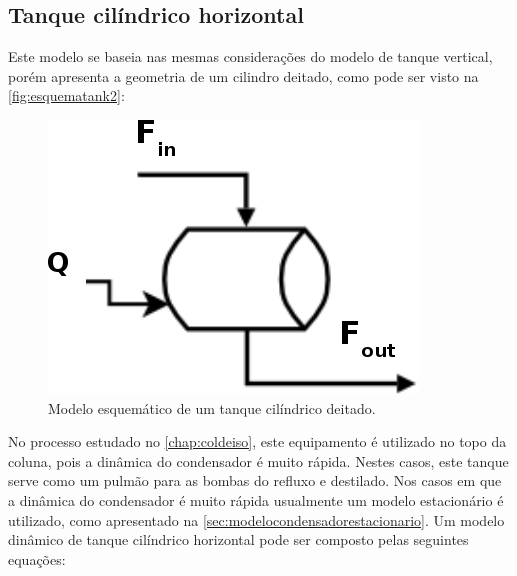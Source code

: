 \subsection{Tanque cilíndrico horizontal} \label{sec:modelotanquecilindrodeitado}
Este modelo se baseia nas mesmas considerações do modelo de tanque vertical,
porém apresenta a geometria de um cilindro deitado, como pode ser visto na \autoref{fig:esquematank2}:
\begin{figure}[htb]
\centering \includegraphics[scale=0.5]{images/Chap3/esquematank_22.png}
\caption{Modelo esquemático de um tanque cilíndrico deitado.}
\label{fig:esquematank2}
\end{figure}

No processo estudado no \autoref{chap:coldeiso}, este equipamento é utilizado no
topo da coluna, pois a dinâmica do condensador é muito rápida.
Nestes casos, este tanque serve como um pulmão para as bombas do refluxo e destilado.
Nos casos em que a dinâmica do condensador é muito rápida usualmente um modelo estacionário é utilizado,
como apresentado na \autoref{sec:modelocondensadorestacionario}.
Um modelo dinâmico de tanque cilíndrico horizontal pode ser composto pelas seguintes equações:


